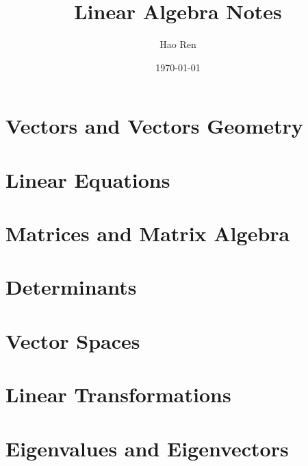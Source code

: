 \documentclass{article}
\begin{document}
\title{Linear Algebra Notes}
\author{Hao Ren}
\date{\today}
\maketitle

\section{Vectors and Vectors Geometry}

\section{Linear Equations}

\section{Matrices and Matrix Algebra}

\section{Determinants}

\section{Vector Spaces}

\section{Linear Transformations}

\section{Eigenvalues and Eigenvectors}
\end{document}
